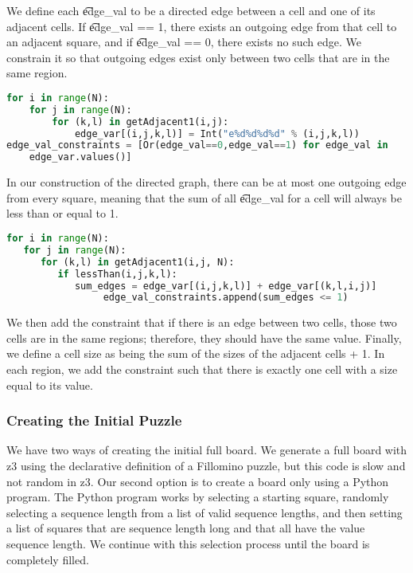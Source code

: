 We define each \t{edge\_val} to be a directed edge between a cell and
one of its adjacent cells. If \t{edge\_val == 1}, there exists an
outgoing edge from that cell to an adjacent square, and if
\t{edge\_val == 0}, there exists no such edge. We constrain it so that
outgoing edges exist only between two cells that are in the same
region.

\singlespace
\begin{lstlisting}[language=python, frame=single]
for i in range(N):
    for j in range(N):
        for (k,l) in getAdjacent1(i,j):
            edge_var[(i,j,k,l)] = Int("e%d%d%d%d" % (i,j,k,l))
edge_val_constraints = [Or(edge_val==0,edge_val==1) for edge_val in
    edge_var.values()]
\end{lstlisting}
\doublespace

In our construction of the directed graph, there can be at most one outgoing edge from every square, meaning that the sum of all \t{edge\_val} for a cell will always be less than or equal to 1.

\singlespace
\begin{lstlisting}[language=python, frame=single]
for i in range(N):
   for j in range(N):
      for (k,l) in getAdjacent1(i,j, N):
         if lessThan(i,j,k,l):
            sum_edges = edge_var[(i,j,k,l)] + edge_var[(k,l,i,j)]
                 edge_val_constraints.append(sum_edges <= 1)
\end{lstlisting}
\doublespace

We then add the constraint that if there is an edge between two cells,
those two cells are in the same regions; therefore, they should have
the same value. Finally, we define a cell size as being the sum of the
sizes of the adjacent cells + 1. In each region, we add the constraint
such that there is exactly one cell with a size equal to its value.

\subsubsection*{Creating the Initial Puzzle}
We have two ways of creating the initial full board. We generate a
full board with z3 using the declarative definition of a Fillomino
puzzle, but this code is slow and not random in z3. Our second option
is to create a board only using a Python program. The Python program works by
selecting a starting square, randomly selecting a sequence length from
a list of valid sequence lengths, and then setting a list of squares
that are sequence length long and that all have the value sequence
length. We continue with this selection process until the board is completely filled.


